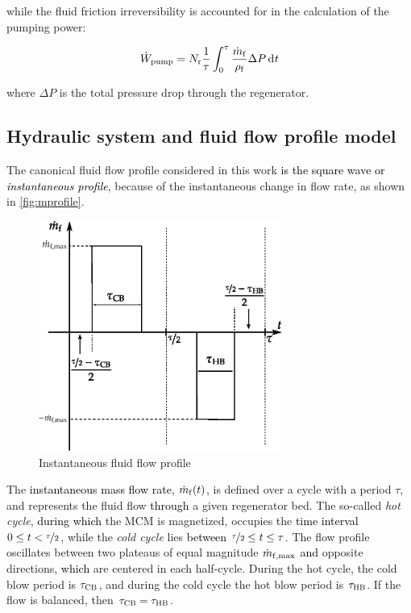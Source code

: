 \documentclass[draft]{svjour3}
\begin{document}
\noindent while the fluid friction irreversibility is accounted for in the calculation of the pumping power:

\begin{equation}
\label{eq:103}
\wpump = N\ped{r}\frac{1}{\tau}\int_0^{\tau}\frac{\rate{m}\ped{f}}{\rho\ped{f}} \Delta P \diffd{t}
\end{equation}

\noindent where $\Delta P$ is the total pressure drop through the regenerator.


\subsection{Hydraulic system  and fluid flow profile model}
\label{sec:hydr-syst-model}

The canonical fluid flow profile considered in this work \textcolor{black}{ is the square wave or \emph{instantaneous profile}}, because of the instantaneous change in flow rate, as shown in \autoref{fig:mprofile}. 

\begin{figure}[!ht]
  \centering
  \includegraphics[width=8cm]{mprofile}
  \caption{Instantaneous fluid flow profile}
  \label{fig:mprofile}
\end{figure}

The \textcolor{black}{instantaneous mass flow rate}, \(\dot{m}_{\mathrm{f}}(t)\), is defined over a cycle with \textcolor{black}{a} period \(\tau\), and represents the fluid flow \textcolor{black}{through} a given regenerator bed. The so-called \emph{hot cycle}, \textcolor{black}{during which} the MCM is magnetized, occupies the \textcolor{black}{time interval} \(0 \le t < \nicefrac{\tau}{2}\), while the \emph{cold cycle}
lies \textcolor{black}{between} \(\nicefrac{\tau}{2} \le t \le \tau\). The flow profile oscillates between two plateaus of equal magnitude
\(\dot{m}_{\mathrm{f,max}}\) \textcolor{black}{and} opposite directions, \textcolor{black}{which} are centered in each half-cycle. During the hot cycle, the cold
blow period is \(\tau_{\mathrm{CB}}\), and during the cold cycle the hot blow period is \(\tau_{\mathrm{HB}}\). If the flow is balanced, then \(\tau_{\mathrm{CB}} = \tau_{\mathrm{HB}}\).
\end{document}

